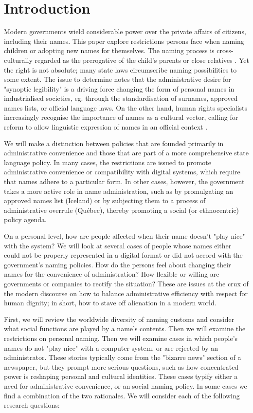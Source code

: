 \section{Introduction}

Modern governments wield considerable power over the private affairs of
citizens, including their names. This paper explore restrictions persons face
when naming children or adopting new names for themselves. The naming process is
cross-culturally regarded as the prerogative of the child's parents or close
relatives \parencite{alford02}. Yet the right is not absolute; many state laws
circumscribe naming possibilities to some extent. The issue to determine
\textcite{scott02} notes that the administrative desire for "synoptic
legibility" is a driving force changing the form of personal names in
industrialised societies, eg. through the standardisation of surnames, approved
names lists, or official language laws. On the other hand, human rights
specialists increasingly recognise the importance of names as a cultural vector,
calling for reform to allow linguistic expression of names in an official
context \parencite{varennes15}.

We will make a distinction between policies that are founded primarily in
administrative convenience and those that are part of a more comprehensive state
language policy. In many cases, the restrictions are issued to promote
administrative convenience or compatibility with digital systems, which require
that names adhere to a particular form. In other cases, however, the government
takes a more active role in name administration, such as by promulgating an
approved names list (Iceland) or by subjecting them to a process of
administrative overrule (Québec), thereby promoting a social (or ethnocentric)
policy agenda.

On a personal level, how are people affected when their name doesn't "play nice"
with the system? We will look at several cases of people whose names either
could not be properly represented in a digital format or did not accord with the
government's naming policies. How do the persons feel about changing their names
for the convenience of administration? How flexible or willing are governments
or companies to rectify the situation? These are issues at the crux of the
modern discourse on how to balance administrative efficiency with respect for
human dignity; in short, how to stave off alienation in a modern world.

First, we will review the worldwide diversity of naming customs and consider
what social functions are played by a name's contents. Then we will examine the
restrictions on personal naming. Then we will examine cases in which people's
names do not "play nice" with a computer system, or are rejected by an
administrator. These stories typically come from the "bizarre news" section of a
newspaper, but they prompt more serious questions, such as how concentrated
power is reshaping personal and cultural identities. These cases typify either a
need for administrative convenience, or an social naming policy. In some cases
we find a combination of the two rationales. We will consider each of the
following research questions:

